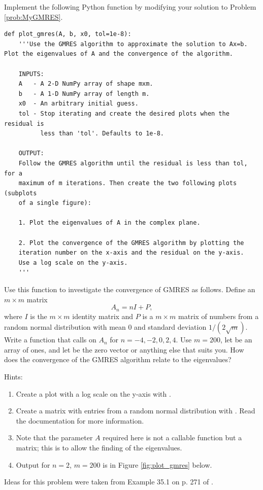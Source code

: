 \begin{problem}\label{prob:plot_gmres}
Implement the following Python function by modifying your solution to Problem \ref{prob:MyGMRES}.

\begin{lstlisting}
def plot_gmres(A, b, x0, tol=1e-8):
    '''Use the GMRES algorithm to approximate the solution to Ax=b. Plot the eigenvalues of A and the convergence of the algorithm.
    
    INPUTS:
    A   - A 2-D NumPy array of shape mxm.
    b   - A 1-D NumPy array of length m.
    x0  - An arbitrary initial guess.
    tol - Stop iterating and create the desired plots when the residual is
          less than 'tol'. Defaults to 1e-8.
    
    OUTPUT:
    Follow the GMRES algorithm until the residual is less than tol, for a 
    maximum of m iterations. Then create the two following plots (subplots
    of a single figure):
     
    1. Plot the eigenvalues of A in the complex plane.
    
    2. Plot the convergence of the GMRES algorithm by plotting the
    iteration number on the x-axis and the residual on the y-axis.
    Use a log scale on the y-axis.
    '''
\end{lstlisting}

Use this function to investigate the convergence of GMRES as follows. 
Define an $m\times m$ matrix
\[A_n = nI+P,\]
 where $I$ is the $m \times m$ identity matrix and $P$ is a $m \times m$ matrix of numbers from a random normal distribution with mean 0 and standard deviation $1/(2\sqrt{m})$. 
 Write a function that calls  on $A_n$ for $n=-4,-2,0,2,4$. Use $m=200$, let  be an array of ones, and let  be the zero vector or anything else that suits you. How does the convergence of the GMRES algorithm relate to the eigenvalues?
 
 Hints:
 \begin{enumerate}
 \item Create a plot with a log scale on the y-axis with .
 \item Create a matrix with entries from a random normal distribution with .  Read the documentation for more information.
 \item Note that the parameter $A$ required here is not a callable function but a matrix; this is to allow the finding of the eigenvalues.
 \item Output for $n=2$, $m=200$ is in Figure \ref{fig:plot_gmres} below.
 \end{enumerate}
Ideas for this problem were taken from Example 35.1 on p. 271 of \cite{Trefethen1997}.
\end{problem}

